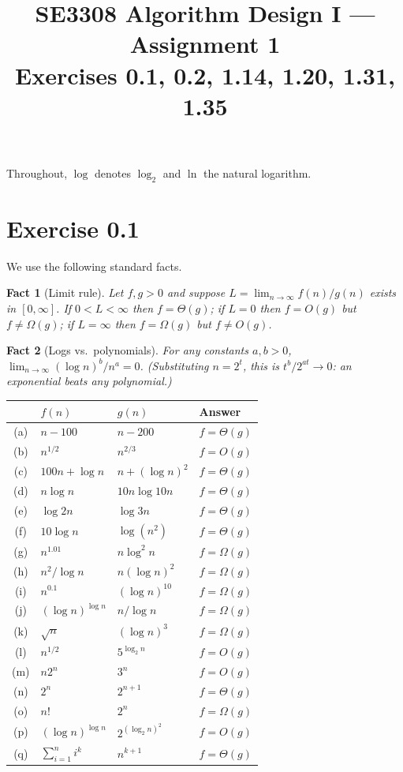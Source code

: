 \documentclass[11pt]{article}
\title{SE3308 Algorithm Design I --- Assignment 1\\[0.3em]
  \large Exercises 0.1, 0.2, 1.14, 1.20, 1.31, 1.35}
\author{\studentname\ifx\studentid\empty\else\quad\studentid\fi}
\date{}
\newtheorem*{fact}{Fact}
\theoremstyle{definition}
\begin{document}
\maketitle

Throughout, $\log$ denotes $\log_2$ and $\ln$ the natural logarithm.

\section*{Exercise 0.1}

We use the following standard facts.

\begin{fact}[Limit rule]
Let $f,g>0$ and suppose $L=\lim_{n\to\infty} f(n)/g(n)$ exists in $[0,\infty]$.
If $0<L<\infty$ then $f=\Theta(g)$; if $L=0$ then $f=O(g)$ but $f\neq\Omega(g)$;
if $L=\infty$ then $f=\Omega(g)$ but $f\neq O(g)$.
\end{fact}

\begin{fact}[Logs vs.\ polynomials]
For any constants $a,b>0$, $\lim_{n\to\infty}(\log n)^b/n^a=0$.
(Substituting $n=2^t$, this is $t^b/2^{at}\to 0$: an exponential beats any polynomial.)
\end{fact}

\begin{center}
\renewcommand{\arraystretch}{1.25}
\begin{tabular}{clll}
\toprule
 & $f(n)$ & $g(n)$ & Answer \\
\midrule
(a) & $n-100$ & $n-200$ & $f=\Theta(g)$ \\
(b) & $n^{1/2}$ & $n^{2/3}$ & $f=O(g)$ \\
(c) & $100n+\log n$ & $n+(\log n)^2$ & $f=\Theta(g)$ \\
(d) & $n\log n$ & $10n\log 10n$ & $f=\Theta(g)$ \\
(e) & $\log 2n$ & $\log 3n$ & $f=\Theta(g)$ \\
(f) & $10\log n$ & $\log(n^2)$ & $f=\Theta(g)$ \\
(g) & $n^{1.01}$ & $n\log^2 n$ & $f=\Omega(g)$ \\
(h) & $n^2/\log n$ & $n(\log n)^2$ & $f=\Omega(g)$ \\
(i) & $n^{0.1}$ & $(\log n)^{10}$ & $f=\Omega(g)$ \\
(j) & $(\log n)^{\log n}$ & $n/\log n$ & $f=\Omega(g)$ \\
(k) & $\sqrt n$ & $(\log n)^3$ & $f=\Omega(g)$ \\
(l) & $n^{1/2}$ & $5^{\log_2 n}$ & $f=O(g)$ \\
(m) & $n2^n$ & $3^n$ & $f=O(g)$ \\
(n) & $2^n$ & $2^{n+1}$ & $f=\Theta(g)$ \\
(o) & $n!$ & $2^n$ & $f=\Omega(g)$ \\
(p) & $(\log n)^{\log n}$ & $2^{(\log_2 n)^2}$ & $f=O(g)$ \\
(q) & $\sum_{i=1}^n i^k$ & $n^{k+1}$ & $f=\Theta(g)$ \\
\bottomrule
\end{tabular}
\end{center}
\end{document}
